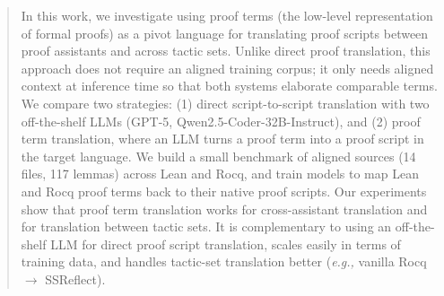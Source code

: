 \documentclass{article}
\theoremstyle{plain}
\theoremstyle{definition}
\theoremstyle{remark}
\newcommand{\eg}{\emph{e.g.,}\xspace}
\begin{document}
	
	
	\printAffiliationsAndNotice{}
	
	\begin{abstract}
		In this work, we investigate using proof terms (the low-level representation of formal proofs) as a pivot language for translating proof scripts between proof assistants and across tactic sets. Unlike direct proof translation, this approach does not require an aligned training corpus; it only needs aligned context at inference time so that both systems elaborate comparable terms. We compare two strategies: (1) direct script-to-script translation with two off-the-shelf LLMs (GPT-5, Qwen2.5-Coder-32B-Instruct), and (2) proof term translation, where an LLM turns a proof term into a proof script in the target language. We build a small benchmark of aligned sources (14 files, 117 lemmas) across Lean and Rocq, and train models to map Lean and Rocq proof terms back to their native proof scripts. Our experiments show that proof term translation works for cross-assistant translation and for translation between tactic sets. It is complementary to using an off-the-shelf LLM for direct proof script translation, scales easily in terms of training data, and handles tactic-set translation better (\eg vanilla Rocq $\to$ SSReflect).
	\end{abstract}
	
\end{document}
